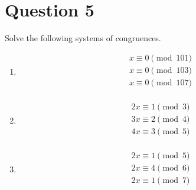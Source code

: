 \documentclass[openany]{report}
\begin{document}
\section{Question 5}
Solve the following systems of congruences.
\begin{enumerate}[label=(\alph*)]
    \item 
    \begin{align*}
        x \equiv 0 \pmod{101} \\
        x \equiv 0 \pmod{103} \\
        x \equiv 0 \pmod{107} \\
    \end{align*}
    \item 
    \begin{align*}
        2x \equiv 1 \pmod{3} \\
        3x \equiv 2 \pmod{4} \\
        4x \equiv 3 \pmod{5} \\
    \end{align*}
    \item 
    \begin{align*}
        2x \equiv 1 \pmod{5} \\
        2x \equiv 4 \pmod{6} \\
        2x \equiv 1 \pmod{7} \\
    \end{align*}
\end{enumerate}
\end{document}
